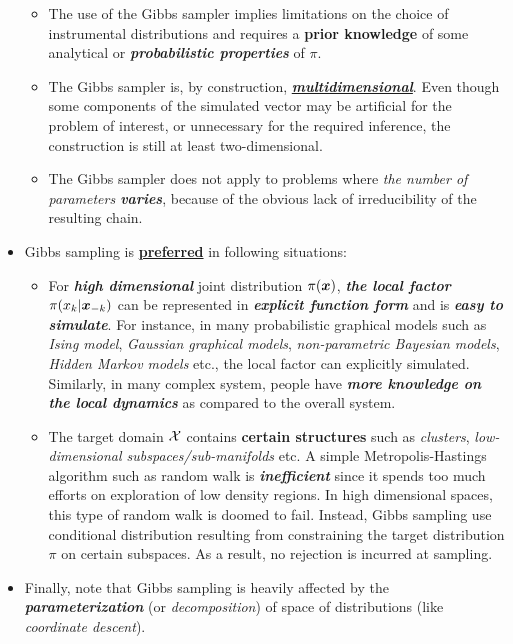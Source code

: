 \documentclass[11pt]{article}
\begin{document}
\begin{itemize}
\begin{itemize}
\item The use of the Gibbs sampler implies limitations on the choice of instrumental distributions and requires a \textbf{prior knowledge} of some analytical or \emph{\textbf{probabilistic properties}} of $\pi$.

\item The Gibbs sampler is, by construction, \underline{\emph{\textbf{multidimensional}}}. Even though some components of the simulated vector may be artificial for the problem of interest, or unnecessary for the required inference, the construction is still at least two-dimensional.

\item The Gibbs sampler does not apply to problems where \emph{the number of parameters \textbf{varies}}, because of the obvious lack of irreducibility of the resulting chain.
\end{itemize}

\item Gibbs sampling is \underline{\textbf{preferred}} in following situations:
\begin{itemize}
\item For \textbf{\emph{high dimensional}} joint distribution $\pi(\boldsymbol{x})$, \emph{\textbf{the local factor}} $\pi(x_k | \boldsymbol{x}_{-k})$ can be represented in \emph{\textbf{explicit function form}} and is \emph{\textbf{easy to simulate}}. For instance, in many probabilistic graphical models such as \emph{Ising model}, \emph{Gaussian graphical models}, \emph{non-parametric Bayesian models}, \emph{Hidden Markov models} etc., the local factor can explicitly simulated.  Similarly, in many complex system, people have \emph{\textbf{more knowledge on the local dynamics}} as compared to the overall system. 

\item The target domain ${\mathcal X}$ contains \textbf{certain structures} such as \emph{clusters}, \emph{low-dimensional subspaces/sub-manifolds} etc. A simple Metropolis-Hastings algorithm such as random walk is \textbf{\emph{inefficient}} since it spends too much efforts on exploration of low density regions. In high dimensional spaces, this type of random walk is doomed to fail. Instead, Gibbs sampling use conditional distribution resulting from constraining the target distribution $\pi$ on certain subspaces. As a result, no rejection is incurred at sampling.
\end{itemize}
\item Finally, note that Gibbs sampling is heavily affected by the \textbf{\emph{parameterization}} (or \emph{decomposition}) of space of distributions (like \emph{coordinate descent}). 
\end{itemize}
\end{document}
